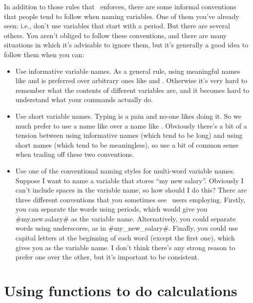 \noindent
In addition to those rules that \R\ enforces, there are some informal conventions that people tend to follow when naming variables. One of them you've already seen: i.e., don't use variables that start with a period. But there are several others. You aren't obliged to follow these conventions, and there are many situations in which it's advisable to ignore them, but it's generally a good idea to follow them when you can:

\begin{itemize}
\item Use informative variable names. As a general rule, using meaningful names like  and  is preferred over arbitrary ones like  and . Otherwise it's very hard to remember what the contents of different variables are, and it becomes hard to understand what your commands actually do. 
\item Use short variable names. Typing is a pain and no-one likes doing it. So we much prefer to use a name like  over a name like . Obviously there's a bit of a tension between using informative names (which tend to be long) and using short names (which tend to be meaningless), so use a bit of common sense when trading off these two conventions.
\item Use one of the conventional naming styles for multi-word variable names. Suppose I want to name a variable that stores ``my new salary''. Obviously I can't include spaces in the variable name, so how should I do this? There are three different conventions that you sometimes see \R\ users employing. Firstly, you can separate the words using periods, which would give you \rtextverb#my.new.salary# as the variable name. Alternatively, you could separate words using underscores, as in \rtextverb#my_new_salary#. Finally, you could use capital letters at the beginning of each word (except the first one), which gives you  as the variable name. I don't think there's any strong reason to prefer one over the other, but it's important to be consistent.
\end{itemize}




\section{Using functions to do calculations\label{sec:usingfunctions}}


